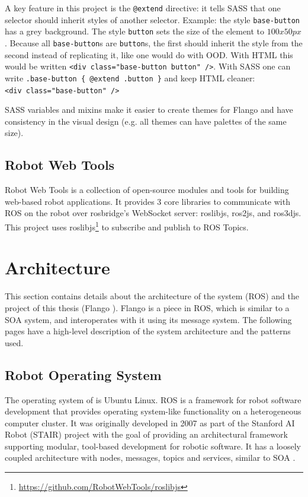 A key feature in this project is the \lstinline$@extend$ directive: it tells \ac{SASS} that one selector should inherit styles of another selector.
Example: the style \texttt{base-button} has a grey background. The style \texttt{button} sets the size of the element to $100 x 50 px$.
Because all \texttt{base-button}s are \texttt{button}s, the first should inherit the style from the second instead of replicating it, like one would do with \ac{OOD}.
With \ac{HTML} this would be written \lstinline$<div class="base-button button" />$.
With SASS one can write \lstinline$.base-button { @extend .button }$ and keep \ac{HTML} cleaner: \\ \lstinline$<div class="base-button" />$

SASS variables and mixins make it easier to create themes for Flango \cm and have consistency in the visual design (e.g. all themes can have palettes of the same size).

\subsection{Robot Web Tools}
Robot Web Tools is a collection of open-source modules and tools for building web-based robot applications.
It provides 3 core libraries to communicate with \ac{ROS} on the robot over rosbridge's WebSocket server: roslibjs, ros2js, and ros3djs.
This project uses roslibjs\footnote{\url{https://github.com/RobotWebTools/roslibjs}} to subscribe and publish to \ac{ROS} Topics.

\section{Architecture}
This section contains details about the architecture of the system (ROS) and the project of this thesis (Flango \cm ). 
Flango \cm is a piece in \ac{ROS}, which is similar to a \ac{SOA} system, and interoperates with it using its message system.
The following pages have a high-level description of the system architecture and the patterns used.

\subsection{Robot Operating System}
The operating system of  is Ubuntu Linux. \acf{ROS} is a framework for robot software development that provides operating system-like functionality on a heterogeneous computer cluster.
It was originally developed in 2007 as part of the Stanford AI Robot (STAIR) project with the goal of providing an architectural framework supporting modular, tool-based development for robotic software.
It has a loosely coupled architecture with nodes, messages, topics and services, similar to \ac{SOA} \cite{ROS:2009}.

